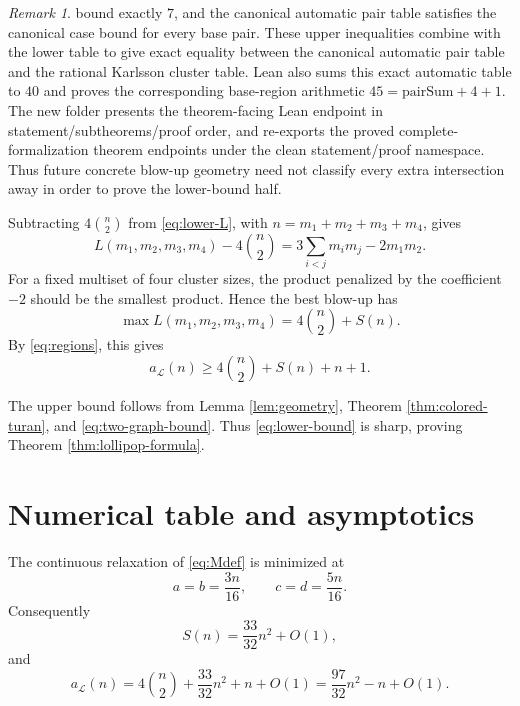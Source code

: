 \documentclass[12pt]{article}
\theoremstyle{plain}
\theoremstyle{definition}
\theoremstyle{remark}
\newtheorem{remark}[theorem]{Remark}
\newcommand{\Lop}{\mathcal L}
\begin{document}
\begin{remark}
bound exactly \(7\), and the canonical automatic pair table satisfies the
canonical case bound for every base pair.  These upper inequalities combine
with the lower table to give exact equality between the canonical automatic
pair table and the rational Karlsson cluster table.  Lean also sums this exact
automatic table to \(40\) and proves the corresponding base-region arithmetic
\(45=\mathrm{pairSum}+4+1\).  The new
 folder presents the theorem-facing Lean endpoint in
statement/subtheorems/proof order, and
 re-exports the proved
complete-formalization theorem endpoints under the clean statement/proof
namespace.  Thus future concrete blow-up geometry need not classify every
extra intersection away in order to prove the lower-bound half.
\end{remark}

Subtracting \(4\binom n2\) from \eqref{eq:lower-L}, with
\(n=m_1+m_2+m_3+m_4\), gives
\[
  L(m_1,m_2,m_3,m_4)-4\binom n2
  =3\sum_{i<j}m_i m_j-2m_1m_2.
\]
For a fixed multiset of four cluster sizes, the product penalized by the
coefficient \(-2\) should be the smallest product.  Hence the best blow-up has
\[
  \max L(m_1,m_2,m_3,m_4)=4\binom n2+S(n).
\]
By \eqref{eq:regions}, this gives
\begin{equation}\label{eq:lower-bound}
  a_{\Lop}(n)\ge4\binom n2+S(n)+n+1.
\end{equation}

The upper bound follows from Lemma \ref{lem:geometry}, Theorem
\ref{thm:colored-turan}, and \eqref{eq:two-graph-bound}.  Thus
\eqref{eq:lower-bound} is sharp, proving Theorem \ref{thm:lollipop-formula}.

\section{Numerical table and asymptotics}

The continuous relaxation of \eqref{eq:Mdef} is minimized at
\[
  a=b=\frac{3n}{16},\qquad c=d=\frac{5n}{16}.
\]
Consequently
\[
  S(n)=\frac{33}{32}n^2+O(1),
\]
and
\[
  a_{\Lop}(n)=4\binom n2+\frac{33}{32}n^2+n+O(1)
  =\frac{97}{32}n^2-n+O(1).
\]
\end{document}

